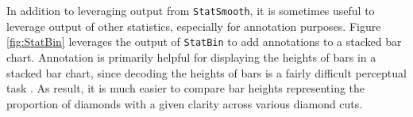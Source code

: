 \documentclass[
  12pt,
]{krantz}
\newenvironment{Shaded}{\begin{snugshade}}{\end{snugshade}}
\newcommand{\DataTypeTok}[1]{\textcolor[rgb]{0.13,0.29,0.53}{#1}}
\newcommand{\DecValTok}[1]{\textcolor[rgb]{0.00,0.00,0.81}{#1}}
\newcommand{\FloatTok}[1]{\textcolor[rgb]{0.00,0.00,0.81}{#1}}
\newcommand{\KeywordTok}[1]{\textcolor[rgb]{0.13,0.29,0.53}{\textbf{#1}}}
\newcommand{\NormalTok}[1]{#1}
\newcommand{\OperatorTok}[1]{\textcolor[rgb]{0.81,0.36,0.00}{\textbf{#1}}}
\newcommand{\OtherTok}[1]{\textcolor[rgb]{0.56,0.35,0.01}{#1}}
\newcommand{\StringTok}[1]{\textcolor[rgb]{0.31,0.60,0.02}{#1}}
\begin{document}
In addition to leveraging output from \texttt{StatSmooth}, it is sometimes useful to leverage output of other statistics, especially for annotation purposes. Figure \ref{fig:StatBin} leverages the output of \texttt{StatBin} to add annotations to a stacked bar chart. Annotation is primarily helpful for displaying the heights of bars in a stacked bar chart, since decoding the heights of bars is a fairly difficult perceptual task \citep{graphical-perception}. As result, it is much easier to compare bar heights representing the proportion of diamonds with a given clarity across various diamond cuts.

\begin{Shaded}
\end{Shaded}
\end{document}
